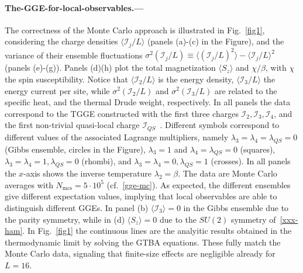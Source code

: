 \documentclass[twocolumn,superscriptaddress,prb,10pt]{revtex4-1}
\begin{document}
\paragraph*{The-GGE-for-local-observables.---} 

The correctness of the Monte Carlo approach is illustrated in Fig.~\ref{fig1}, considering 
the charge densities $\langle {\mathcal I}_j/L\rangle$ (panels (a)-(c) in the Figure), 
and the variance of their ensemble fluctuations $\sigma^2({\mathcal I}_j/L)\equiv
\langle({\mathcal I}_j/L)^2\rangle-\langle{\mathcal I}_j/L\rangle^2$ (panels (e)-(g)). 
Panels (d)(h) plot the total magnetization $\langle S_z\rangle$ and $\chi/\beta$, 
with $\chi$ the spin susceptibility. Notice that $\langle{\mathcal I}_2/L\rangle$ is the energy 
density, $\langle{\mathcal I}_3/L\rangle$ the energy current per site, while $\sigma^2({
\mathcal I}_2/L)$ and $\sigma^2({\mathcal I}_3/L)$ are related to the specific heat, and the 
thermal Drude weight, respectively. In all panels the data correspond to the TGGE constructed 
with the first three charges ${\mathcal I}_2,{\mathcal I}_3,{\mathcal I}_4$, and the first 
non-trivial quasi-local charge ${\mathcal I}_{QS}$~\cite{ilievski-2015,ilievski-2015a}. 
Different symbols correspond to different values of the associated Lagrange multipliers, 
namely $\lambda_3=\lambda_4=\lambda_{QS}=0$ (Gibbs ensemble, circles in the Figure), $\lambda_3=1$ and 
$\lambda_4=\lambda_{QS}=0$ (squares), $\lambda_3=\lambda_4=1,\lambda_{QS}=0$ (rhombi), and 
$\lambda_3=\lambda_4=0,\lambda_{QS}=1$ (crosses). 
In all panels the $x$-axis shows the inverse temperature $\lambda_2=\beta$. The data 
are Monte Carlo averages with $N_{\textrm{mcs}}=5\cdot 10^5$ (cf.~\eqref{gge-mc}). 
As expected, the different ensembles give different expectation values, implying that 
local observables are able to distinguish different GGEs. In panel 
(b) $\langle {\mathcal I}_3\rangle=0$ in the Gibbs ensemble due to the parity 
symmetry, while in (d) $\langle S_z\rangle=0$ due to the $SU(2)$ symmetry of~\eqref{xxx-ham}. 
In Fig.~\ref{fig1} the continuous lines are the analyitic results obtained 
in the thermodynamic limit by solving the GTBA equations. These fully match the Monte 
Carlo data, signaling  that finite-size effects are negligible already for $L=16$.  
\end{document}
